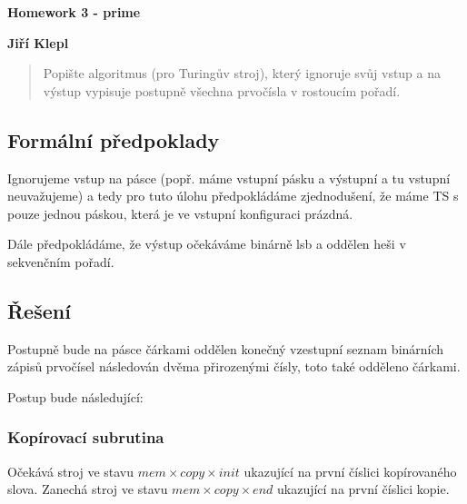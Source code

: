 \documentclass[a4paper,12pt]{article} %
\begin{document}
\thispagestyle{empty} %

\begin{center}
	{\Large \bf Homework 3 - prime}
	\vspace{2mm}
	
	{\bf Jiří Klepl}
		
\end{center}  

\vspace{0.4cm}


\begin{quote}
Popište algoritmus (pro Turingův stroj), který ignoruje svůj vstup a na výstup vypisuje postupně všechna prvočísla v rostoucím pořadí.
\end{quote}

\subsection*{Formální předpoklady}

Ignorujeme vstup na pásce (popř. máme vstupní pásku a výstupní a tu vstupní neuvažujeme) a tedy pro tuto úlohu předpokládáme zjednodušení, že máme TS s pouze jednou páskou, která je ve vstupní konfiguraci prázdná.

Dále předpokládáme, že výstup očekáváme binárně lsb a oddělen heši v sekvenčním pořadí.

\subsection*{Řešení}

Postupně bude na pásce čárkami oddělen konečný vzestupní seznam binárních zápisů prvočísel následován dvěma přirozenými čísly, toto také odděleno čárkami.

Postup bude následující:

\subsubsection*{Kopírovací subrutina}

Očekává stroj ve stavu $mem \times copy \times init$ ukazující na první číslici kopírovaného slova. Zanechá stroj ve stavu $mem \times copy \times end$ ukazující na první číslici kopie.
\end{document}
